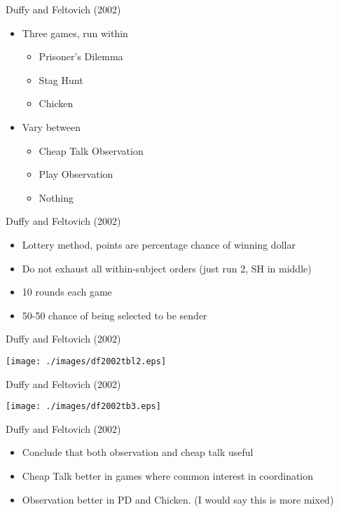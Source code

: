 \documentclass{beamer}
\begin{document}
\begin{frame}{Duffy and Feltovich (2002)}
\begin{itemize}
	\item Three games, run within
		\begin{itemize}
			\item Prisoner's Dilemma
			\item Stag Hunt
			\item Chicken
		\end{itemize}
	\item Vary between
		\begin{itemize}
			\item Cheap Talk Observation
			\item Play Observation
			\item Nothing
		\end{itemize}
	\end{itemize}
\end{frame}

\begin{frame}{Duffy and Feltovich (2002)}
\begin{itemize}
	\item Lottery method, points are percentage chance of winning dollar
	\item Do not exhaust all within-subject orders (just run 2, SH in middle)
	\item 10 rounds each game
	\item 50-50 chance of being selected to be sender
\end{itemize}
\end{frame}

\begin{frame}{Duffy and Feltovich (2002)}
\begin{center}\texttt{[image: ./images/df2002tbl2.eps]}\end{center}
\end{frame}

\begin{frame}{Duffy and Feltovich (2002)}
\begin{center}\texttt{[image: ./images/df2002tb3.eps]}\end{center}
\end{frame}

\begin{frame}{Duffy and Feltovich (2002)}
\begin{itemize}
	\item Conclude that both observation and cheap talk useful
	\item Cheap Talk better in games where common interest in coordination
	\item Observation better in PD and Chicken. (I would say this is more mixed)
\end{itemize}
\end{frame}
\end{document}
